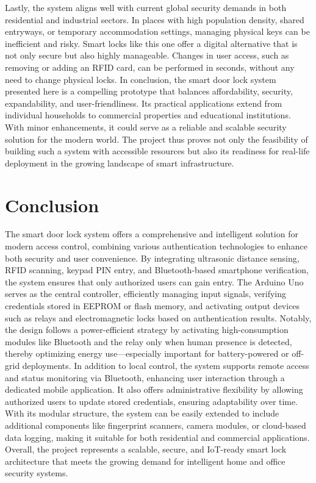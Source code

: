 \documentclass[conference, onecolumn]{IEEEtran}
\begin{document}
Lastly, the system aligns well with current global security demands in both residential and industrial sectors. In places with high population density, shared entryways, or temporary accommodation settings, managing physical keys can be inefficient and risky. Smart locks like this one offer a digital alternative that is not only secure but also highly manageable. Changes in user access, such as removing or adding an RFID card, can be performed in seconds, without any need to change physical locks.
In conclusion, the smart door lock system presented here is a compelling prototype that balances affordability, security, expandability, and user-friendliness. Its practical applications extend from individual households to commercial properties and educational institutions. With minor enhancements, it could serve as a reliable and scalable security solution for the modern world. The project thus proves not only the feasibility of building such a system with accessible resources but also its readiness for real-life deployment in the growing landscape of smart infrastructure.

\section{Conclusion}
The smart door lock system offers a comprehensive and intelligent solution for modern access control, combining various authentication technologies to enhance both security and user convenience. By integrating ultrasonic distance sensing, RFID scanning, keypad PIN entry, and Bluetooth-based smartphone verification, the system ensures that only authorized users can gain entry. The Arduino Uno serves as the central controller, efficiently managing input signals, verifying credentials stored in EEPROM or flash memory, and activating output devices such as relays and electromagnetic locks based on authentication results. Notably, the design follows a power-efficient strategy by activating high-consumption modules like Bluetooth and the relay only when human presence is detected, thereby optimizing energy use—especially important for battery-powered or off-grid deployments. In addition to local control, the system supports remote access and status monitoring via Bluetooth, enhancing user interaction through a dedicated mobile application. It also offers administrative flexibility by allowing authorized users to update stored credentials, ensuring adaptability over time. With its modular structure, the system can be easily extended to include additional components like fingerprint scanners, camera modules, or cloud-based data logging, making it suitable for both residential and commercial applications. Overall, the project represents a scalable, secure, and IoT-ready smart lock architecture that meets the growing demand for intelligent home and office security systems.
\end{document}
